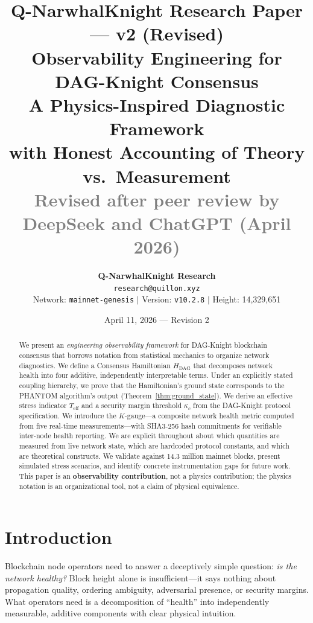 \documentclass[11pt,a4paper,twocolumn]{article}
\title{%
\vspace{-1cm}
{\Large\textcolor{sectionblue}{Q-NarwhalKnight Research Paper --- v2 (Revised)}}\\[0.3cm]
{\LARGE\textbf{Observability Engineering for\\DAG-Knight Consensus}}\\[0.2cm]
{\large A Physics-Inspired Diagnostic Framework\\with Honest Accounting of Theory vs.\ Measurement}\\[0.3cm]
{\normalsize\textcolor{gray}{Revised after peer review by DeepSeek and ChatGPT (April 2026)}}
}
\author{%
\textbf{Q-NarwhalKnight Research}\\
\texttt{research@quillon.xyz}\\[0.2cm]
{\small Network: \texttt{mainnet-genesis} $\mid$ Version: \texttt{v10.2.8} $\mid$ Height: 14,329,651}
}
\date{April 11, 2026 --- Revision 2}
\begin{document}
\maketitle
\thispagestyle{fancy}

\begin{abstract}
We present an \emph{engineering observability framework} for DAG-Knight blockchain consensus that borrows notation from statistical mechanics to organize network diagnostics. We define a Consensus Hamiltonian $H_{\text{DAG}}$ that decomposes network health into four additive, independently interpretable terms. Under an explicitly stated coupling hierarchy, we prove that the Hamiltonian's ground state corresponds to the PHANTOM algorithm's output (Theorem~\ref{thm:ground_state}). We derive an effective stress indicator $T_{\text{eff}}$ and a security margin threshold $\kappa_c$ from the DAG-Knight protocol specification. We introduce the $K$-gauge---a composite network health metric computed from five real-time measurements---with SHA3-256 hash commitments for verifiable inter-node health reporting. We are explicit throughout about which quantities are measured from live network state, which are hardcoded protocol constants, and which are theoretical constructs. We validate against 14.3 million mainnet blocks, present simulated stress scenarios, and identify concrete instrumentation gaps for future work. This paper is an \textbf{observability contribution}, not a physics contribution; the physics notation is an organizational tool, not a claim of physical equivalence.
\end{abstract}

\section{Introduction}

Blockchain node operators need to answer a deceptively simple question: \emph{is the network healthy?} Block height alone is insufficient---it says nothing about propagation quality, ordering ambiguity, adversarial presence, or security margins. What operators need is a decomposition of ``health'' into independently measurable, additive components with clear physical intuition.
\end{document}
